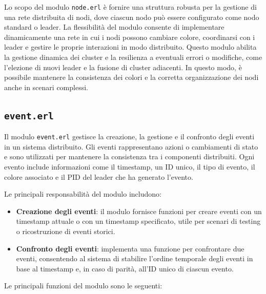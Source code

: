 \documentclass[12pt, a4paper]{report}
\begin{document}
\noindent
Lo scopo del modulo \texttt{node.erl} è fornire una struttura robusta per la gestione di una rete distribuita di nodi, dove ciascun nodo può essere configurato come nodo standard o leader. La flessibilità del modulo consente di implementare dinamicamente una rete in cui i nodi possono cambiare colore, coordinarsi con i leader e gestire le proprie interazioni in modo distribuito. Questo modulo abilita la gestione dinamica dei cluster e la resilienza a eventuali errori o modifiche, come l'elezione di nuovi leader e la fusione di cluster adiacenti. In questo modo, è possibile mantenere la consistenza dei colori e la corretta organizzazione dei nodi anche in scenari complessi.

\subsection{\texttt{event.erl}}

Il modulo \texttt{event.erl} gestisce la creazione, la gestione e il confronto degli eventi in un sistema distribuito. Gli eventi rappresentano azioni o cambiamenti di stato e sono utilizzati per mantenere la consistenza tra i componenti distribuiti. Ogni evento include informazioni come il timestamp, un ID unico, il tipo di evento, il colore associato e il PID del leader che ha generato l'evento.

Le principali responsabilità del modulo includono:

\begin{itemize}
    \item \textbf{Creazione degli eventi}: il modulo fornisce funzioni per creare eventi con un timestamp attuale o con un timestamp specificato, utile per scenari di testing o ricostruzione di eventi storici.

    \item \textbf{Confronto degli eventi}: implementa una funzione per confrontare due eventi, consentendo al sistema di stabilire l'ordine temporale degli eventi in base al timestamp e, in caso di parità, all'ID unico di ciascun evento.

\end{itemize}

\noindent
Le principali funzioni del modulo sono le seguenti:
\end{document}
